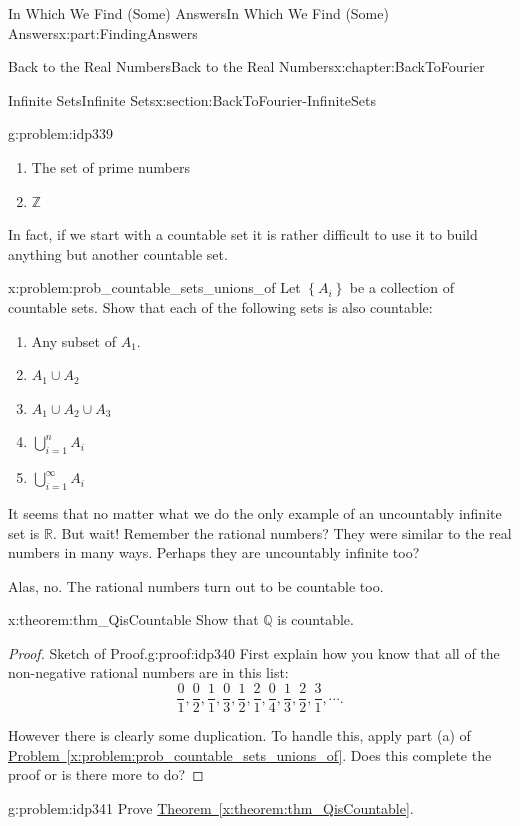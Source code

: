 \documentclass[oneside,10pt,]{book}
\newcommand{\xreffont}{\relax}
\numberwithin{equation}{section}
\newcommand{\RR}{\mathbb {R}}
\newcommand{\QQ}{\mathbb {Q}}
\newcommand{\ZZ}{\mathbb {Z}}
\begin{document}
\begin{partptx}{In Which We Find (Some) Answers}{}{In Which We Find (Some) Answers}{}{}{x:part:FindingAnswers}
\begin{chapterptx}{Back to the Real Numbers}{}{Back to the Real Numbers}{}{}{x:chapter:BackToFourier}
\begin{sectionptx}{Infinite Sets}{}{Infinite Sets}{}{}{x:section:BackToFourier-InfiniteSets}
\begin{problem}{}{g:problem:idp339}
\begin{enumerate}[font=\bfseries,label=(\alph*),ref=\alph*]
\item{}The set of prime numbers%
\item{}\(\ZZ\)%
\end{enumerate}
\end{problem}
In fact, if we start with a countable set it is rather difficult to use it to build anything but another countable set.%
\begin{problem}{}{x:problem:prob_countable_sets_unions_of}%
Let \(\left\{A_i\right\}\) be a collection of countable sets. Show that each of the following sets is also countable:%
\begin{enumerate}[font=\bfseries,label=(\alph*),ref=\alph*]
\item{}Any subset of \(A_1\).%
\item{}\(A_1\cup A_2\)%
\item{}\(A_1\cup A_2 \cup A_3\)%
\item{}\(\displaystyle\bigcup_{i=1}^nA_i\)%
\item{}\(\displaystyle\bigcup_{i=1}^\infty A_i\)%
\end{enumerate}
\end{problem}
It seems that no matter what we do the only example of an uncountably infinite set is \(\RR\).  But wait!  Remember the rational numbers?  They were similar to the real numbers in many ways.  Perhaps they are uncountably infinite too?%
\par
Alas, no. The rational numbers turn out to be countable too.%
\begin{theorem}{}{}{x:theorem:thm_QisCountable}%
\index{\(\QQ\)!is countable} Show that \(\QQ\) is countable.%
\end{theorem}
\begin{proof}{Sketch of Proof.}{g:proof:idp340}
First explain how you know that all of the non-negative rational numbers are in this list:%
\begin{equation*}
\frac{0}{1},\frac{0}{2},\frac{1}{1},\frac{0}{3}, \frac{1}{2},\frac{2}{1},\frac{0}{4},\frac{1}{3}, \frac{2}{2}, \frac{3}{1}, \cdots\text{.}
\end{equation*}
%
\par
However there is clearly some duplication. To handle this, apply part (a) of \hyperref[x:problem:prob_countable_sets_unions_of]{Problem~{\xreffont\ref{x:problem:prob_countable_sets_unions_of}}}. Does this complete the proof or is there more to do?%
\end{proof}
\begin{problem}{}{g:problem:idp341}%
\index{\(\QQ\)!\(\QQ\) is countable} Prove \hyperref[x:theorem:thm_QisCountable]{Theorem~{\xreffont\ref{x:theorem:thm_QisCountable}}}.%

\end{problem}
\end{sectionptx}
\end{chapterptx}
\end{partptx}
\end{document}

